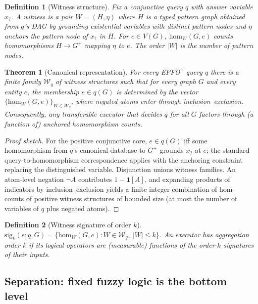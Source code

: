\documentclass[journal]{IEEEtran}
\newtheorem{theorem}{Theorem}
\newtheorem{definition}{Definition}
\begin{document}
\begin{definition}[Witness structure]\label{def:witness}
Fix a conjunctive query $q$ with answer variable $x_?$. A \emph{witness} is
a pair $W=(H,\eta)$ where $H$ is a typed pattern graph obtained from $q$'s
DAG by grounding existential variables with distinct pattern nodes and
$\eta$ anchors the pattern node of $x_?$ in $H$. For
$e\in V(G)$, $\mathrm{hom}_W(G,e)$ counts homomorphisms $H\to G^{+}$
mapping $\eta$ to $e$. The \emph{order} $|W|$ is the number of pattern
nodes.
\end{definition}

\begin{theorem}[Canonical representation]\label{thm:canon}
For every EPFO$^\neg$ query $q$ there is a finite family
$\mathcal{W}_q$ of witness structures such that for every graph $G$ and
every entity $e$, the membership $e\in q(G)$ is determined by the vector
$\{\mathrm{hom}_W(G,e)\}_{W\in\mathcal W_q}$, where negated atoms enter
through inclusion--exclusion. Consequently, any transferable executor that
decides $q$ for all $G$ factors through (a function of) anchored homomorphism
counts.
\end{theorem}
\begin{proof}[Proof sketch]
For the positive conjunctive core, $e\in q(G)$ iff some homomorphism from
$q$'s canonical database to $G^{+}$ grounds $x_?$ at $e$; the standard
query-to-homomorphism correspondence applies with the anchoring constraint
replacing the distinguished variable. Disjunction unions witness families.
An atom-level negation $\neg A$ contributes $1-\mathbf 1[A]$, and expanding
products of indicators by inclusion--exclusion yields a finite integer
combination of hom-counts of positive witness structures of bounded size
(at most the number of variables of $q$ plus negated atoms).
\end{proof}

\begin{definition}[Witness signature of order $k$]\label{def:sig}
$\mathrm{sig}_k(e;q,G)=\{\mathrm{hom}_W(G,e): W\in\mathcal W_q,\ |W|\le k\}$.
An executor has \emph{aggregation order} $k$ if its logical operators are
(measurable) functions of the order-$k$ signatures of their inputs.
\end{definition}

\subsection{Separation: fixed fuzzy logic is the bottom level}
\end{document}
